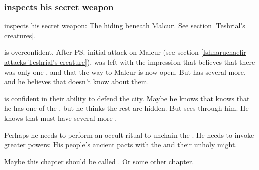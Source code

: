 \begin{garbage}
\subsubsection{\Teshrial{} inspects his secret weapon}
\Teshrial{} inspects his secret weapon: 
The \ghobaleth{} hiding beneath Malcur. 
See section \ref{Teshrial's creatures}. 

\Teshrial{} is overconfident. After \ps{\Ishnaruchaefir} initial attack on Malcur (see section \ref{Ishnaruchaefir attacks Teshrial's creature}), \Teshrial{} was left with the impression that \Ishnaruchaefir{} believes that there was only one \ghobal{}, and that the way to Malcur is now open. But \Teshrial{} has several more, and he believes that \Ishnaruchaefir{} doesn't know about them. 

\Teshrial{} is confident in their ability to defend the city. Maybe he knows that \Ishnaruchaefir{} knows that he has one of the \ghobaleth{}, but he thinks the rest are hidden. But \Ishnaruchaefir{} sees through him. He knows that \Teshrial{} must have several more \ghobaleth{}. 

Perhaps he needs to perform an occult ritual to unchain the \ghobaleth{}. 
He needs to invoke greater powers: 
His people's ancient pacts with the \banelords{} and their unholy might.


Maybe this chapter should be called . 
Or some other chapter.







\end{garbage}
